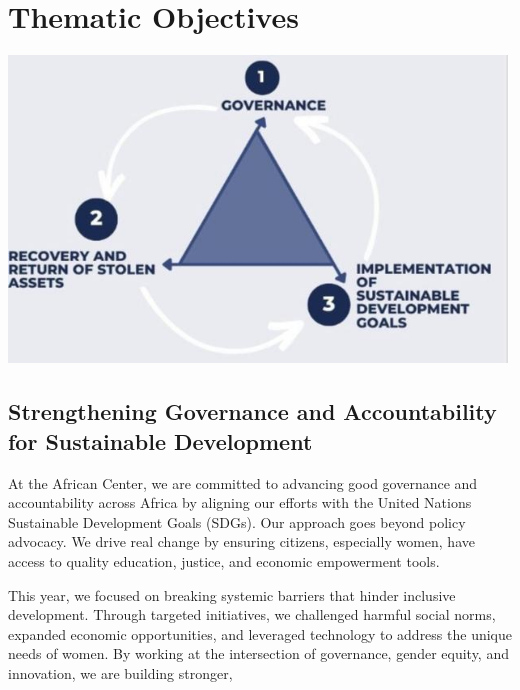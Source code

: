 \documentclass[
  letterpaper,
  DIV=11,
  numbers=noendperiod]{scrreprt}
\begin{document}
\section*{Thematic Objectives}\label{thematic-objectives}


\begin{center}
\includegraphics[width=5.20833in,height=\textheight,keepaspectratio]{images/about/thematic_objectives.jpg}
\end{center}

\subsection*{Strengthening Governance and Accountability for Sustainable
Development}\label{strengthening-governance-and-accountability-for-sustainable-development}

At the African Center, we are committed to advancing good governance and
accountability across Africa by aligning our efforts with the United
Nations Sustainable Development Goals (SDGs). Our approach goes beyond
policy advocacy. We drive real change by ensuring citizens, especially
women, have access to quality education, justice, and economic
empowerment tools.

This year, we focused on breaking systemic barriers that hinder
inclusive development. Through targeted initiatives, we challenged
harmful social norms, expanded economic opportunities, and leveraged
technology to address the unique needs of women. By working at the
intersection of governance, gender equity, and innovation, we are
building stronger,
\end{document}
